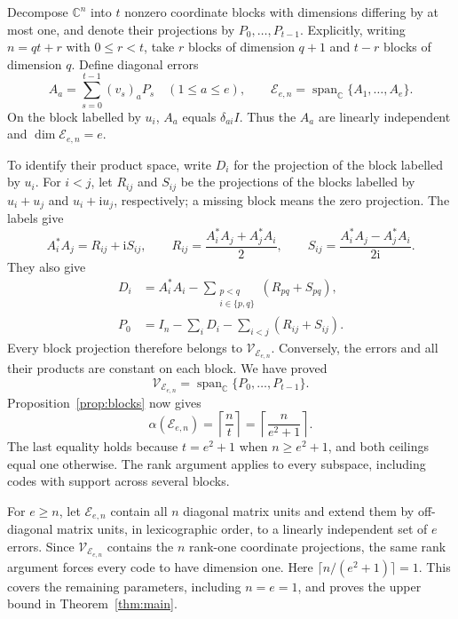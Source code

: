 \documentclass[11pt]{article}
\newcommand{\C}{\mathbb C}
\newcommand{\E}{\mathcal E}
\newcommand{\V}{\mathcal V}
\DeclareMathOperator{\Span}{span}
\theoremstyle{remark}
\numberwithin{equation}{section}
\begin{document}
Decompose $\C^n$ into $t$ nonzero coordinate blocks with dimensions
differing by at most one, and denote their projections by
$P_0,\ldots,P_{t-1}$. Explicitly, writing $n=qt+r$ with $0\le r<t$,
take $r$ blocks of dimension $q+1$ and $t-r$ blocks of dimension $q$.
Define diagonal errors
\begin{equation}\label{eq:errors}
 A_a=\sum_{s=0}^{t-1}(v_s)_aP_s\quad(1\le a\le e),
 \qquad \E_{e,n}=\Span_{\C}\{A_1,\ldots,A_e\}.
\end{equation}
On the block labelled by $u_i$, $A_a$ equals $\delta_{ai}I$.
Thus the $A_a$ are linearly independent and $\dim\E_{e,n}=e$.

To identify their product space, write $D_i$ for the projection of the
block labelled by $u_i$. For $i<j$, let $R_{ij}$ and $S_{ij}$ be the
projections of the blocks labelled by $u_i+u_j$ and
$u_i+\mathrm{i}u_j$, respectively; a missing block means the zero
projection. The labels give
\begin{equation}\label{eq:cross-products}
 A_i^*A_j=R_{ij}+\mathrm{i}S_{ij},\qquad
 R_{ij}=\frac{A_i^*A_j+A_j^*A_i}{2},\qquad
 S_{ij}=\frac{A_i^*A_j-A_j^*A_i}{2\mathrm{i}}.
\end{equation}
They also give
\begin{align}
 D_i&=A_i^*A_i-
 \sum_{\substack{p<q\\i\in\{p,q\}}}(R_{pq}+S_{pq}),
 \label{eq:coordinate-blocks}\\
 P_0&=I_n-\sum_iD_i-\sum_{i<j}(R_{ij}+S_{ij}).
 \label{eq:zero-block}
\end{align}
Every block projection therefore belongs to $\V_{\E_{e,n}}$.
Conversely, the errors and all their products are constant on each
block. We have proved
\begin{equation}\label{eq:block-system}
 \V_{\E_{e,n}}=\Span_{\C}\{P_0,\ldots,P_{t-1}\}.
\end{equation}
Proposition~\ref{prop:blocks} now gives
\begin{equation}\label{eq:largest-code}
 \alpha(\E_{e,n})=\left\lceil\frac nt\right\rceil
 =\left\lceil\frac{n}{e^2+1}\right\rceil.
\end{equation}
The last equality holds because $t=e^2+1$ when $n\ge e^2+1$, and
both ceilings equal one otherwise. The rank argument applies to every
subspace, including codes with support across several blocks.

For $e\ge n$, let $\E_{e,n}$ contain all $n$ diagonal matrix units
and extend them by off-diagonal matrix units, in lexicographic order,
to a linearly independent set of $e$ errors. Since $\V_{\E_{e,n}}$
contains the $n$ rank-one coordinate projections, the same rank argument
forces every code to have dimension one. Here
$\lceil n/(e^2+1)\rceil=1$. This covers the remaining parameters,
including $n=e=1$, and proves the upper bound in
Theorem~\ref{thm:main}.
\end{document}
